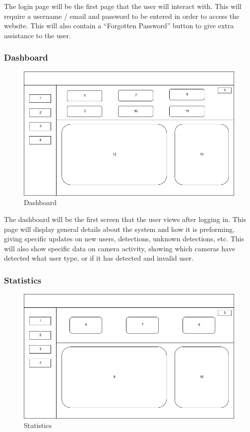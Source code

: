\documentclass[
  english,
  a4paper,
,tablecaptionabove
]{scrartcl}
\begin{document}
The login page will be the first page that the user will interact with.
This will require a username / email and password to be entered in order
to access the website. This will also contain a \enquote{Forgotten
Password} button to give extra assistance to the user.

\newpage

\hypertarget{dashboard}{%
\subsubsection{Dashboard}\label{dashboard}}

\begin{figure}
\centering
\includegraphics{images/ppm-images/dashboard-design.png}
\caption{Dashboard}
\end{figure}

The dashboard will be the first screen that the user views after logging
in. This page will display general details about the system and how it
is preforming, giving specific updates on new users, detections, unknown
detections, etc. This will also show specific data on camera activity,
showing which cameras have detected what user type, or if it has
detected and invalid user.

\newpage

\hypertarget{statistics}{%
\subsubsection{Statistics}\label{statistics}}

\begin{figure}
\centering
\includegraphics{images/ppm-images/statistics-design.png}
\caption{Statistics}
\end{figure}
\end{document}
